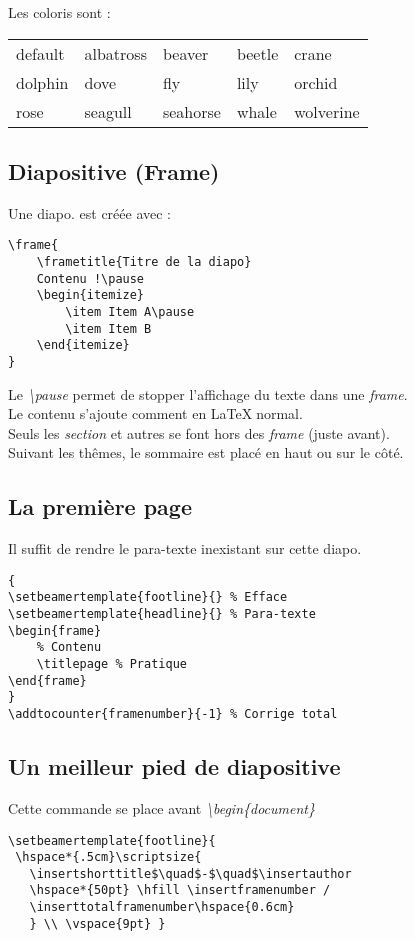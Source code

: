         Les coloris sont :\\
        \begin{tabular}{l l l l l}
            default & albatross & beaver & beetle & crane\\
            dolphin & dove & fly & lily & orchid\\
            rose & seagull & seahorse & whale & wolverine\\
        \end{tabular}


    \subsection{Diapositive (Frame)}
        Une diapo. est créée avec :
        \begin{lstlisting}
\frame{
    \frametitle{Titre de la diapo}
    Contenu !\pause
    \begin{itemize}
        \item Item A\pause
        \item Item B
    \end{itemize}
}
        \end{lstlisting}

        Le \textit{\textbackslash pause} permet de stopper l'affichage du texte dans une \textit{frame}.\\
        Le contenu s'ajoute comment en \LaTeX $\;$normal.\\
        Seuls les \textit{section} et autres se font hors des \textit{frame} (juste avant).\\
        Suivant les thêmes, le sommaire est placé en haut ou sur le côté.


    \subsection{La première page}
        Il suffit de rendre le para-texte inexistant sur cette diapo.
        \begin{lstlisting}
{
\setbeamertemplate{footline}{} % Efface
\setbeamertemplate{headline}{} % Para-texte
\begin{frame}
    % Contenu
    \titlepage % Pratique
\end{frame}
}
\addtocounter{framenumber}{-1} % Corrige total
        \end{lstlisting}

    \subsection{Un meilleur pied de diapositive}
        Cette commande se place avant \textit{\textbackslash begin\{document\}}
        \begin{lstlisting}
\setbeamertemplate{footline}{
 \hspace*{.5cm}\scriptsize{
   \insertshorttitle$\quad$-$\quad$\insertauthor
   \hspace*{50pt} \hfill \insertframenumber /
   \inserttotalframenumber\hspace{0.6cm}
   } \\ \vspace{9pt} }
        \end{lstlisting}


